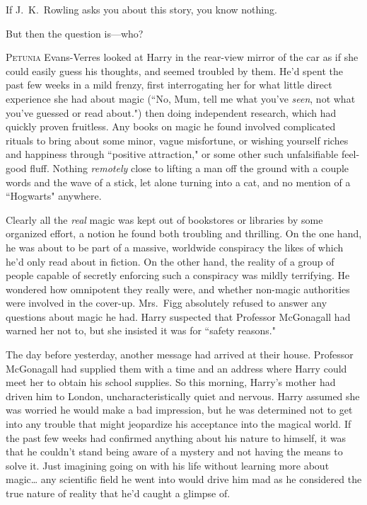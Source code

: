 
\begin{chapterOpeningAuthorNote}
If J.~K.~Rowling asks you about this story, you know nothing.
\end{chapterOpeningAuthorNote}
\begin{chapterOpeningQuote}
But then the question is—who?
\end{chapterOpeningQuote}

\lettrine{P}{etunia} Evans-Verres looked at Harry in the rear-view mirror of the car as if she could easily guess his thoughts, and seemed troubled by them. He'd spent the past few weeks in a mild frenzy, first interrogating her for what little direct experience she had about magic (``No, Mum, tell me what you've \emph{seen}, not what you've guessed or read about.") then doing independent research, which had quickly proven fruitless. Any books on magic he found involved complicated rituals to bring about some minor, vague misfortune, or wishing yourself riches and happiness through ``positive attraction," or some other such unfalsifiable feel-good fluff. Nothing \emph{remotely} close to lifting a man off the ground with a couple words and the wave of a stick, let alone turning into a cat, and no mention of a ``Hogwarts" anywhere.

Clearly all the \emph{real} magic was kept out of bookstores or libraries by some organized effort, a notion he found both troubling and thrilling. On the one hand, he was about to be part of a massive, worldwide conspiracy the likes of which he'd only read about in fiction. On the other hand, the reality of a group of people capable of secretly enforcing such a conspiracy was mildly terrifying. He wondered how omnipotent they really were, and whether non-magic authorities were involved in the cover-up. Mrs.~Figg absolutely refused to answer any questions about magic he had. Harry suspected that Professor McGonagall had warned her not to, but she insisted it was for ``safety reasons."

The day before yesterday, another message had arrived at their house. Professor McGonagall had supplied them with a time and an address where Harry could meet her to obtain his school supplies. So this morning, Harry's mother had driven him to London, uncharacteristically quiet and nervous. Harry assumed she was worried he would make a bad impression, but he was determined not to get into any trouble that might jeopardize his acceptance into the magical world. If the past few weeks had confirmed anything about his nature to himself, it was that he couldn't stand being aware of a mystery and not having the means to solve it. Just imagining going on with his life without learning more about magic{\ldots} any scientific field he went into would drive him mad as he considered the true nature of reality that he'd caught a glimpse of.

